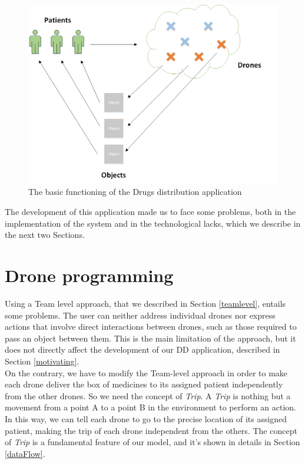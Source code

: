 \begin{figure}[H]
  \centering
  \includegraphics[width=\linewidth]{pictures/DD.png}
  \caption{The basic functioning of the Drugs distribution application}
  \label{fig:motivating}
\end{figure}

The development of this application made us to face some problems, both in the implementation of the system and in the technological lacks, which we describe in the next two Sections.


\section{Drone programming}\label{teamlevelproblems}

Using a Team level approach, that we described in Section \ref{teamlevel}, entails some problems. 
The user can neither address individual drones nor express actions that involve direct interactions between drones, such as those required to pass an object between them.
This is the main limitation of the approach, but it does not directly affect the development of our DD application, described in Section \ref{motivating}.
\\

On the contrary, we have to modify the Team-level approach in order to make each drone deliver the box of medicines to its assigned patient independently from the other drones. So we need the concept of \textit{Trip}.
A \textit{Trip} is nothing but a movement from a point A to a point B in the environment to perform an action.
In this way, we can tell each drone to go to the precise location of its assigned patient, making the trip of each drone independent from the others.
The concept of \textit{Trip} is a fundamental feature of our model, and it's shown in details in Section \ref{dataFlow}.
\\


